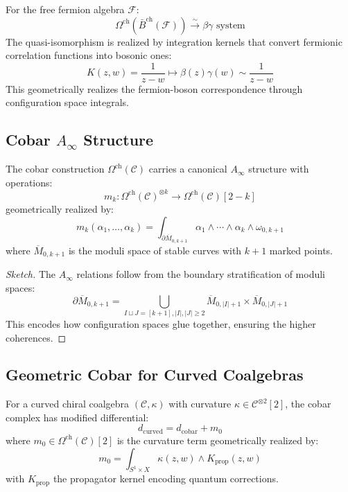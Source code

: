 \begin{example}\label{ex:cobar-bar-fermion}
For the free fermion algebra $\mathcal{F}$:
\[
\Omega^{\text{ch}}(\bar{B}^{\text{ch}}(\mathcal{F})) \xrightarrow{\sim} \beta\gamma \text{ system}
\]
The quasi-isomorphism is realized by integration kernels that convert fermionic correlation functions into bosonic ones:
\[
K(z,w) = \frac{1}{z-w} \mapsto \beta(z)\gamma(w) \sim \frac{1}{z-w}
\]
This geometrically realizes the fermion-boson correspondence through configuration space integrals.
\end{example}


\subsection{Cobar $A_\infty$ Structure}

\begin{theorem}\label{thm:cobar-ainfty}
The cobar construction $\Omega^{\text{ch}}(\mathcal{C})$ carries a canonical $A_\infty$ structure with operations:
\[
m_k: \Omega^{\text{ch}}(\mathcal{C})^{\otimes k} \to \Omega^{\text{ch}}(\mathcal{C})[2-k]
\]
geometrically realized by:
\[
m_k(\alpha_1, \ldots, \alpha_k) = \int_{\partial \overline{M}_{0,k+1}} \alpha_1 \wedge \cdots \wedge \alpha_k \wedge \omega_{0,k+1}
\]
where $\overline{M}_{0,k+1}$ is the moduli space of stable curves with $k+1$ marked points.
\end{theorem}

\begin{proof}[Sketch]
The $A_\infty$ relations follow from the boundary stratification of moduli spaces:
\[
\partial \overline{M}_{0,k+1} = \bigcup_{I \sqcup J = [k+1], |I|,|J| \geq 2} \overline{M}_{0,|I|+1} \times \overline{M}_{0,|J|+1}
\]
This encodes how configuration spaces glue together, ensuring the higher coherences.
\end{proof}

\subsection{Geometric Cobar for Curved Coalgebras}

\begin{definition}\label{def:curved-cobar}
For a curved chiral coalgebra $(\mathcal{C}, \kappa)$ with curvature $\kappa \in \mathcal{C}^{\otimes 2}[2]$, the cobar complex has modified differential:
\[
d_{\text{curved}} = d_{\text{cobar}} + m_0
\]
where $m_0 \in \Omega^{\text{ch}}(\mathcal{C})[2]$ is the curvature term geometrically realized by:
\[
m_0 = \int_{S^1 \times X} \kappa(z, w) \wedge K_{\text{prop}}(z, w) 
\]
with $K_{\text{prop}}$ the propagator kernel encoding quantum corrections.
\end{definition}


